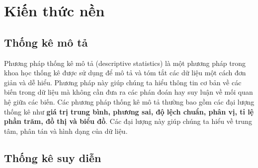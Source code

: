 \section{Kiến thức nền}\label{Kien thuc nen}
\subsection{Thống kê mô tả}
Phương pháp thống kê mô tả (descriptive statistics) là một phương pháp trong khoa học thống kê được sử dụng để mô tả và tóm tắt các dữ liệu một cách đơn giản và dễ hiểu. Phương pháp này giúp chúng ta hiểu thông tin cơ bản về các biến trong dữ liệu mà không cần đưa ra các phán đoán hay suy luận về mối quan hệ giữa các biến. Các phương pháp thống kê mô tả thường bao gồm các đại lượng thống kê như \textbf{giá trị trung bình, phương sai, độ lệch chuẩn, phân vị, tỉ lệ phần trăm, đồ thị và biểu đồ}. Các đại lượng này giúp chúng ta hiểu về trung tâm, phân tán và hình dạng của dữ liệu.
\subsection{Thống kê suy diễn}
\subsubsection{}